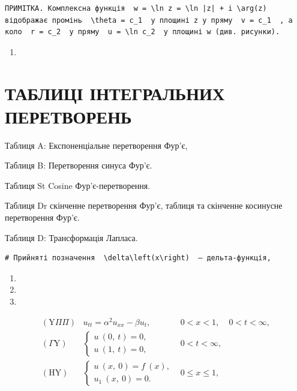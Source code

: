 \documentclass[
  ukrainian,
]{article}
\providecommand{\tightlist}{%
  \setlength{\itemsep}{0pt}\setlength{\parskip}{0pt}}
\begin{document}
\begin{verbatim}
ПРИМІТКА. Комплексна функція  w = \ln z = \ln |z| + i \arg(z)  відображає промінь  \theta = c_1  у площині z у пряму  v = c_1  , а коло  r = c_2  у пряму  u = \ln c_2  у площині w (див. рисунки).
\end{verbatim}

\begin{enumerate}
\def\labelenumi{\arabic{enumi}.}
\setcounter{enumi}{10}
\tightlist
\item
\end{enumerate}

\section{ТАБЛИЦІ ІНТЕГРАЛЬНИХ
ПЕРЕТВОРЕНЬ}\label{ux442ux430ux431ux43bux438ux446ux456-ux456ux43dux442ux435ux433ux440ux430ux43bux44cux43dux438ux445-ux43fux435ux440ux435ux442ux432ux43eux440ux435ux43dux44c}

Таблиця A: Експоненціальне перетворення Фур'є,

Таблиця B: Перетворення синуса Фур'є.

Таблиця St Cosine Фур'є-перетворення.

Таблиця Dr скінченне перетворення Фур'є, таблиця та скінченне косинусне
перетворення Фур'є.

Таблиця D: Трансформація Лапласа.

\begin{verbatim}
# Прийняті позначення  \delta\left(x\right)  — дельта-функція,
\end{verbatim}

\begin{enumerate}
\def\labelenumi{\arabic{enumi}.}
\setcounter{enumi}{11}
\tightlist
\item
\item
\item
\end{enumerate}

\[
\begin{array}{llll} (\mathrm{Y} \Pi \Pi) & u_{tt} = \alpha^2 u_{xx} - \beta u_t, & 0 < x < 1, & 0 < t < \infty, \\ (\Gamma \mathrm{Y}) & \begin{cases} u \ (0, \ t) = 0, \\ u \ (1, \ t) = 0, \end{cases} & 0 < t < \infty, \\ (\mathrm{H} \mathrm{Y}) & \begin{cases} u \ (x, \ 0) = f \ (x), \\ u_1 \ (x, \ 0) = 0. \end{cases} & 0 \leqslant x \leqslant 1, \end{array}
\]
\end{document}
